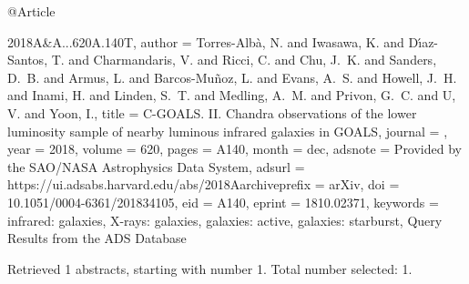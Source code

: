 \documentclass[longauth]{aa}
\begin{document}
{{{{@Article{2018A&A...620A.140T,
  author        = {{Torres-Alb{\`a}}, N. and {Iwasawa}, K. and {D{\'{\i}}az-Santos}, T. and {Charmandaris}, V. and {Ricci}, C. and {Chu}, J.~K. and {Sanders}, D.~B. and {Armus}, L. and {Barcos-Mu{\~n}oz}, L. and {Evans}, A.~S. and {Howell}, J.~H. and {Inami}, H. and {Linden}, S.~T. and {Medling}, A.~M. and {Privon}, G.~C. and {U}, V. and {Yoon}, I.},
  title         = {C-GOALS. II. Chandra observations of the lower luminosity sample of nearby luminous infrared galaxies in GOALS},
  journal       = {\aap},
  year          = {2018},
  volume        = {620},
  pages         = {A140},
  month         = dec,
  adsnote       = {Provided by the SAO/NASA Astrophysics Data System},
  adsurl        = {https://ui.adsabs.harvard.edu/abs/2018Aarchiveprefix = {arXiv},
  doi           = {10.1051/0004-6361/201834105},
  eid           = {A140},
  eprint        = {1810.02371},
  keywords      = {infrared: galaxies, X-rays: galaxies, galaxies: active, galaxies: starburst},
}
Query Results from the ADS Database


Retrieved 1 abstracts, starting with number 1.  Total number selected: 1.

}}}}}
\end{document}
